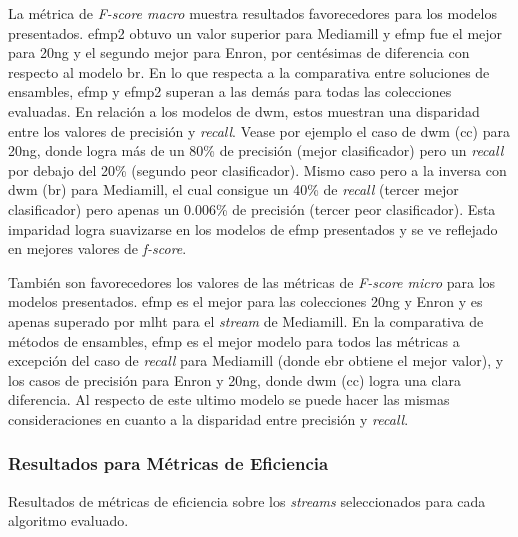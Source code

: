La métrica de \textit{F-score macro} muestra resultados favorecedores para los
modelos presentados. \acrshort{efmp2} obtuvo un valor superior para Mediamill y
\acrshort{efmp} fue el mejor para 20ng y el segundo mejor para Enron, por
centésimas de diferencia con respecto al modelo \acrshort{br}. En lo que
respecta a la comparativa entre soluciones de ensambles, \acrshort{efmp} y
\acrshort{efmp2} superan a las demás para todas las colecciones evaluadas.  En
relación a los modelos de \acrshort{dwm}, estos muestran una disparidad entre
los valores de precisión y \textit{recall}. Vease por ejemplo el caso de
\acrshort{dwm} (\acrshort{cc}) para 20ng, donde logra más de un 80\% de
precisión (mejor clasificador) pero un \textit{recall} por debajo del 20\% (segundo peor
clasificador). Mismo caso pero a la inversa con \acrshort{dwm} (\acrshort{br})
para Mediamill, el cual consigue un 40\% de \textit{recall} (tercer mejor
clasificador) pero apenas un 0.006\% de precisión (tercer peor clasificador).
Esta imparidad logra suavizarse en los modelos de \acrshort{efmp} presentados y
se ve reflejado en mejores valores de \textit{f-score}.

También son favorecedores los valores de las métricas de \textit{F-score micro}
para los modelos presentados. \acrshort{efmp} es el mejor para las colecciones
20ng y Enron y es apenas superado por \acrshort{mlht} para el \textit{stream} de
Mediamill. En la comparativa de métodos de ensambles, \acrshort{efmp} es el
mejor modelo para todos las métricas a excepción del caso de \textit{recall}
para Mediamill (donde \acrshort{ebr} obtiene el mejor valor), y los casos de
precisión para Enron y 20ng, donde \acrshort{dwm} (\acrshort{cc}) logra una
clara diferencia. Al respecto de este ultimo modelo se puede hacer las mismas
consideraciones en cuanto a la disparidad entre precisión y \textit{recall}.

\subsubsection{Resultados para Métricas de Eficiencia}

\begin{table}[htbp]
	\centering
	\begin{adjustbox}{max width=\textwidth}
		
	\end{adjustbox}
	\caption{Resultados de métricas de eficiencia sobre los
		\textit{streams} seleccionados para cada algoritmo evaluado.}
	\label{tab:efficiency}
\end{table}


